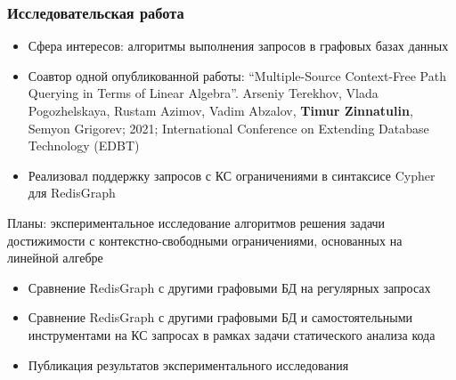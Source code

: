 \documentclass[xcolor=table,aspectratio=169]{beamer}
\begin{document}
            


\begin{frame}[fragile] \frametitle{Исследовательская работа}
  
    \begin{itemize}
        \item Сфера интересов: алгоритмы выполнения запросов в графовых базах данных
        \item Соавтор одной опубликованной работы: ``Multiple-Source Context-Free Path Querying in Terms of Linear Algebra''. Arseniy Terekhov, Vlada Pogozhelskaya, Rustam Azimov, Vadim Abzalov, \textbf{Timur Zinnatulin}, Semyon Grigorev; 2021; International Conference on Extending Database Technology (EDBT)        
        \item Реализовал поддержку запросов с КС ограничениями в синтаксисе Cypher для RedisGraph
    \end{itemize}
  \pause
  \vfill
  Планы: экспериментальное исследование алгоритмов решения задачи достижимости с контекстно-свободными ограничениями, основанных на линейной алгебре
  \begin{itemize}
        \item Сравнение RedisGraph с другими графовыми БД на регулярных запросах
        \item Сравнение RedisGraph с другими графовыми БД и самостоятельными инструментами на КС запросах в рамках задачи статического анализа кода
        \item Публикация результатов экспериментального исследования
  \end{itemize}

\end{frame}
\end{document}

